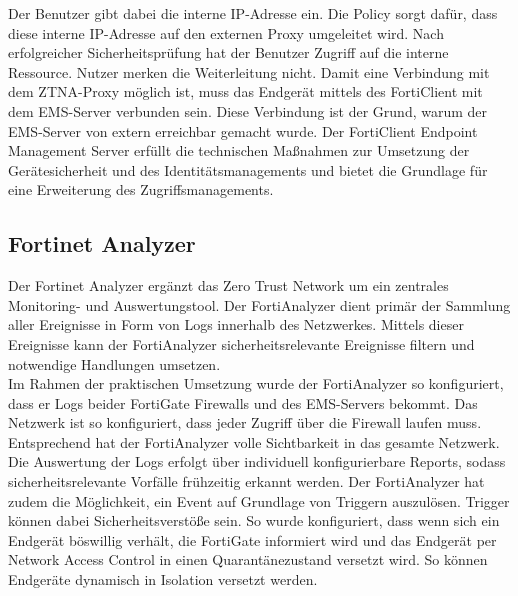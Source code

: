 \documentclass[lettersize,journal]{IEEEtran}
\begin{document}
Der Benutzer gibt dabei die interne IP-Adresse ein. Die Policy sorgt dafür, dass diese interne IP-Adresse auf den externen Proxy umgeleitet wird. Nach erfolgreicher Sicherheitsprüfung hat der Benutzer Zugriff auf die interne Ressource. Nutzer merken die Weiterleitung nicht. Damit eine Verbindung mit dem ZTNA-Proxy möglich ist, muss das Endgerät mittels des FortiClient mit dem EMS-Server verbunden sein. Diese Verbindung ist der Grund, warum der EMS-Server von extern erreichbar gemacht wurde. Der FortiClient Endpoint Management Server erfüllt die technischen Maßnahmen zur Umsetzung der Gerätesicherheit und des Identitätsmanagements und bietet die Grundlage für eine Erweiterung des Zugriffsmanagements.

\subsection{Fortinet Analyzer}
Der Fortinet Analyzer ergänzt das Zero Trust Network um ein zentrales Monitoring- und Auswertungstool. Der FortiAnalyzer dient primär der Sammlung aller Ereignisse in Form von Logs innerhalb des Netzwerkes. Mittels dieser Ereignisse kann der FortiAnalyzer sicherheitsrelevante Ereignisse filtern und notwendige Handlungen umsetzen.\\
Im Rahmen der praktischen Umsetzung wurde der FortiAnalyzer so konfiguriert, dass er Logs beider FortiGate Firewalls und des EMS-Servers bekommt. Das Netzwerk ist so konfiguriert, dass jeder Zugriff über die Firewall laufen muss. Entsprechend hat der FortiAnalyzer volle Sichtbarkeit in das gesamte Netzwerk. Die Auswertung der Logs erfolgt über individuell konfigurierbare Reports, sodass sicherheitsrelevante Vorfälle frühzeitig erkannt werden. Der FortiAnalyzer hat zudem die Möglichkeit, ein Event auf Grundlage von Triggern auszulösen. Trigger können dabei Sicherheitsverstöße sein. So wurde konfiguriert, dass wenn sich ein Endgerät böswillig verhält, die FortiGate informiert wird und das Endgerät per Network Access Control in einen Quarantänezustand versetzt wird. So können Endgeräte dynamisch in Isolation versetzt werden.
\end{document}
